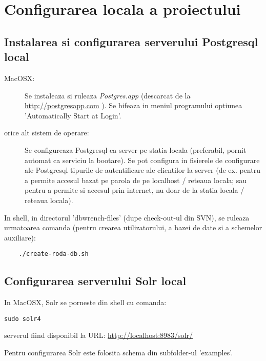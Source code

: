 \section{Configurarea locala a proiectului}

\subsection{Instalarea si configurarea serverului Postgresql local}
\label{postgresql_configurare}

\begin{description}
\item[MacOSX:]

Se instaleaza si ruleaza \emph{Postgres.app} (descarcat de la \url{http://postgresapp.com} ).
Se bifeaza in meniul programului optiunea 'Automatically Start at Login'.

\item[orice alt sistem de operare:]

Se configureaza Postgresql ca server pe statia locala 
(preferabil, pornit automat ca serviciu la bootare). 
Se pot configura in fisierele de configurare ale Postgresql tipurile de autentificare ale clientilor la server 
(de ex. pentru a permite accesul bazat pe parola de pe localhost / reteaua locala; sau pentru a permite si accesul prin
internet, nu doar de la statia locala / reteaua locala).
\end{description}

In shell, in directorul 'dbwrench-files' (dupe check-out-ul din SVN), 
se ruleaza urmatoarea comanda
(pentru crearea utilizatorului, a bazei de date si a schemelor auxiliare):
\begin{lstlisting}
	./create-roda-db.sh
\end{lstlisting}

\subsection{Configurarea serverului Solr local}
\label{solr_configurare}

In MacOSX, Solr se porneste din shell cu comanda:
\begin{lstlisting}[breaklines=true]
	sudo solr4
\end{lstlisting}
serverul fiind disponibil la URL: \url{http://localhost:8983/solr/}

Pentru configurarea Solr este folosita schema din subfolder-ul 'examples'. 

